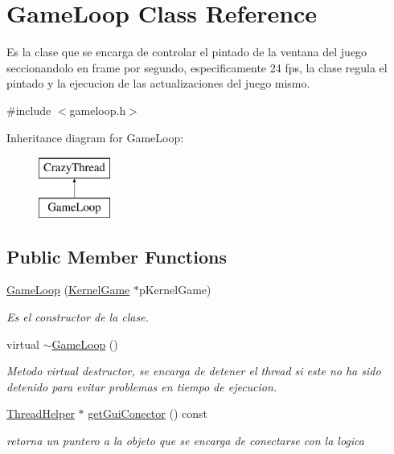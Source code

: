 \hypertarget{class_game_loop}{\section{Game\-Loop Class Reference}
\label{class_game_loop}
}


Es la clase que se encarga de controlar el pintado de la ventana del juego seccionandolo en frame por segundo, especificamente 24 fps, la clase regula el pintado y la ejecucion de las actualizaciones del juego mismo.  




{\ttfamily \#include $<$gameloop.\-h$>$}

Inheritance diagram for Game\-Loop\-:\begin{figure}[H]
\begin{center}
\leavevmode
\includegraphics[height=2.000000cm]{class_game_loop}
\end{center}
\end{figure}
\subsection*{Public Member Functions}
\begin{DoxyCompactItemize}
\item 
\hyperlink{class_game_loop_adbe6559d3c3270054090db3b98a5c2d5}{Game\-Loop} (\hyperlink{class_kernel_game}{Kernel\-Game} $\ast$p\-Kernel\-Game)
\begin{DoxyCompactList}\small\item\em Es el constructor de la clase. \end{DoxyCompactList}\item 
\hypertarget{class_game_loop_ae6c558d0d751a068dbafe2cae465ec1f}{virtual \hyperlink{class_game_loop_ae6c558d0d751a068dbafe2cae465ec1f}{$\sim$\-Game\-Loop} ()}\label{class_game_loop_ae6c558d0d751a068dbafe2cae465ec1f}

\begin{DoxyCompactList}\small\item\em Metodo virtual destructor, se encarga de detener el thread si este no ha sido detenido para evitar problemas en tiempo de ejecucion. \end{DoxyCompactList}\item 
\hyperlink{class_thread_helper}{Thread\-Helper} $\ast$ \hyperlink{class_game_loop_aa95091d6b9fbc580219ee08374ca1642}{get\-Gui\-Conector} () const 
\begin{DoxyCompactList}\small\item\em retorna un puntero a la objeto que se encarga de conectarse con la logica \end{DoxyCompactList}\end{DoxyCompactItemize}
